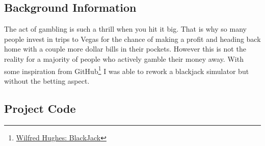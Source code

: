 \documentclass{article}
\begin{document}
    \subsection{Background Information}
    The act of gambling is such a thrill when you hit it big. That is why so many people invest in trips to Vegas for the chance of making a profit and heading back home with a couple more dollar bills in their pockets. However this is not the reality for a majority of people who actively gamble their money away. With some inspiration from GitHub\footnote{\href{https://github.com/Wilfred/Blackjack/blob/master/Blackjack.hs}{Wilfred Hughes: BlackJack}} I was able to rework a blackjack simulator but without the betting aspect. 
    
    \subsection{Project Code}
\end{document}
